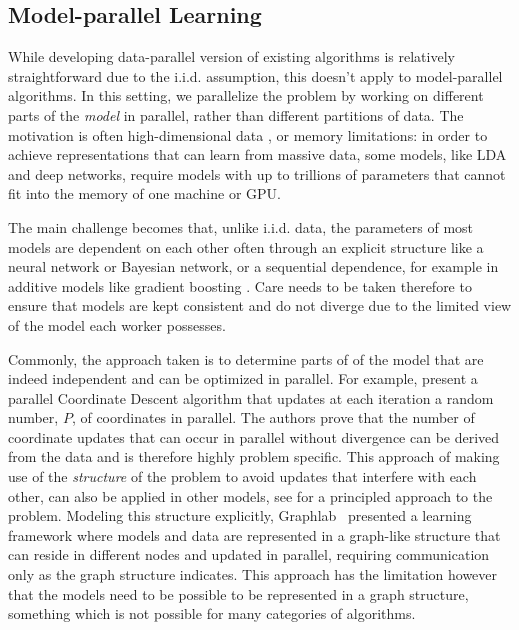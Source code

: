 \subsection*{Model-parallel Learning}

While developing data-parallel version of existing algorithms is relatively straightforward
due to the i.i.d. assumption, this doesn't apply to model-parallel algorithms. In this
setting, we parallelize the problem by working on different parts of the \emph{model}
in parallel, rather than different partitions of data. The motivation is often
high-dimensional data \cite{parallel-cd-l1}, or
memory limitations: in order to achieve representations
that can learn from massive data, some models, like LDA and deep networks, require
models with up to trillions of parameters \cite{lightLDA, large-scale-dl}
that cannot fit into the memory of one machine or GPU.

The main challenge becomes
that, unlike i.i.d. data, the parameters of most models are dependent on each
other often through an explicit structure like a neural network or Bayesian network, or a
sequential dependence, for example in additive models like gradient boosting \cite{esl}.
Care needs to be taken therefore to ensure that models are kept consistent and do not
diverge due to the limited view of the model each worker possesses.

Commonly, the approach taken is to determine parts of of the model that are indeed
independent and can be optimized in parallel. For example, \citet{parallel-cd-l1}
present a parallel Coordinate Descent algorithm that updates at each iteration
a random number, $P$, of coordinates in parallel. The authors prove that the number of coordinate updates
that can occur in parallel without divergence can be derived from the data and is therefore
highly problem specific. This approach of making use of the \emph{structure} of
the problem to avoid updates that interfere with each other, can also be applied
in other models, see \citet{model-parallel-learning} for a principled approach
to the problem.
Modeling this structure explicitly, Graphlab~\cite{graphlab, graphlab-distributed} presented a learning framework
where models and data are represented in a graph-like structure that can reside in different
nodes and updated in parallel, requiring communication only as the graph structure
indicates. This approach has the limitation however that the models need to be
possible to be represented in a graph structure, something which is not possible
for many categories of algorithms.

